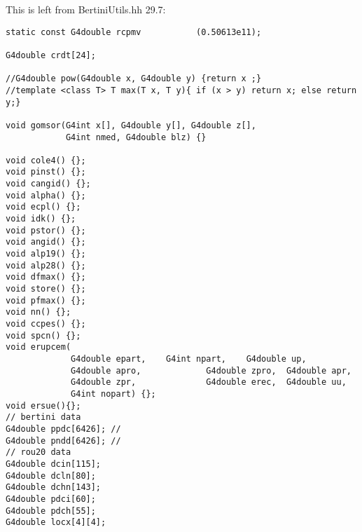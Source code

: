 This is left from BertiniUtils.hh 29.7:

\begin{verbatim}
static const G4double rcpmv           (0.50613e11);

G4double crdt[24];

//G4double pow(G4double x, G4double y) {return x ;}
//template <class T> T max(T x, T y){ if (x > y) return x; else return y;}

void gomsor(G4int x[], G4double y[], G4double z[], 
            G4int nmed, G4double blz) {}                   

void cole4() {};
void pinst() {};
void cangid() {};
void alpha() {};
void ecpl() {};
void idk() {};
void pstor() {};
void angid() {};
void alp19() {};
void alp28() {};
void dfmax() {};
void store() {};
void pfmax() {};
void nn() {};
void ccpes() {};
void spcn() {};
void erupcem(
             G4double epart,    G4int npart,    G4double up, 
             G4double apro,             G4double zpro,  G4double apr, 
             G4double zpr,              G4double erec,  G4double uu, 
             G4int nopart) {};
void ersue(){};
// bertini data
G4double ppdc[6426]; //
G4double pndd[6426]; //
// rou20 data
G4double dcin[115];  
G4double dcln[80]; 
G4double dchn[143]; 
G4double pdci[60]; 
G4double pdch[55];
G4double locx[4][4];
\end{verbatim}










